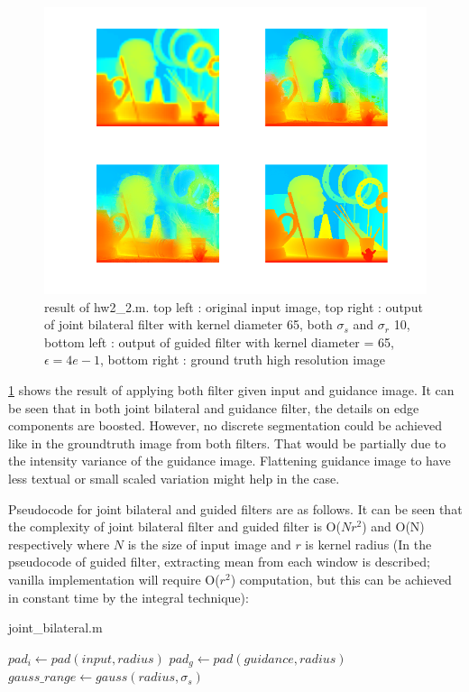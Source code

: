 \documentclass[extendedabs]{bmvc2k}
\begin{document}
\begin{figure}[h]
    \centering
    \includegraphics[width=\linewidth]{hw2_2_1}
    \caption{result of hw2\_2.m. top left : original input image,
    top right : output of joint bilateral filter with kernel diameter 65,
    both $\sigma_s$ and $\sigma_r$ 10,
    bottom left : output of guided filter with kernel diameter = 65, $\epsilon = 4e-1$,
    bottom right : ground truth high resolution image}
    \label{fig:9}
\end{figure}

\figurename{\ref{fig:9}} shows the result of applying both filter given input and guidance image.
It can be seen that in both joint bilateral and guidance filter, the details on edge components
are boosted. However, no discrete segmentation could be achieved like in the groundtruth image
from both filters. That would be partially due to the intensity variance of the guidance image.
Flattening guidance image to have less textual or small scaled variation might help in the case.

Pseudocode for joint bilateral and guided filters are as follows. It can be seen that
the complexity of joint bilateral filter and guided filter is O($Nr^2$) and O(N) respectively 
where $N$ is the size of input image and $r$ is kernel radius (In the pseudocode of guided filter,
extracting mean from each window is described; vanilla implementation will require O($r^2$) computation,
but this can be achieved in constant time by the integral technique):

\begin{algorithm}
    \caption{joint\_bilateral.m}
    $pad_{i} \gets pad(input, radius)$\;
    $pad_{g} \gets pad(guidance, radius)$\;
    $gauss\_range \gets gauss(radius, \sigma_s)$\;
    
\end{algorithm}
\end{document}
